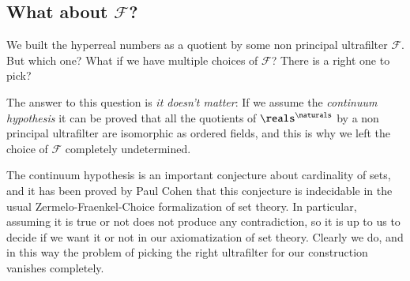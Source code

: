 \documentclass[adraft, copyright,creativecommons,sharealike,noncommercial]{eptcs}
\begin{document}
\subsection{What about $\mathcal{F}$?}
We built the hyperreal numbers as a quotient by some non principal ultrafilter $\mathcal{F}$. But which one? What if we have multiple choices of $\mathcal{F}$? There is a right one to pick?

The answer to this question is \emph{it doesn't matter}: If we assume the \emph{continuum hypothesis} it can be proved that all the quotients of $\reals^\naturals$ by a non principal ultrafilter are isomorphic as ordered fields, and this is why we left the choice of $\mathcal{F}$ completely undetermined.

The continuum hypothesis is an important conjecture about cardinality of sets, and it has been proved by Paul Cohen that this conjecture is indecidable in the usual Zermelo-Fraenkel-Choice formalization of set theory. In particular, assuming it is true or not does not produce any contradiction, so it is up to us to decide if we want it or not in our axiomatization of set theory. Clearly we do, and in this way the problem of picking the right ultrafilter for our construction vanishes completely.
\end{document}

